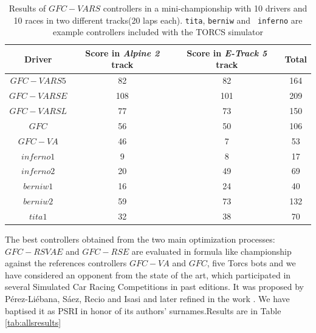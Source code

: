 \documentclass[10pt,journal,compsoc]{IEEEtran}
\begin{document}
%
\begin{table}[ht]
	\centering
	{\scriptsize
		\caption{ Results of $GFC-VARS$ controllers in a mini-championship with 10 drivers and 10
			races in two different tracks(20 laps each). {\tt tita}, {\tt berniw} and {\tt
				inferno} are example controllers included with the TORCS
			simulator \cite{torcs4}}
		{
			\begin{tabular}{|c|c|c||c|}
				\hline
				Driver&Score in \textit{Alpine 2} track &Score in \textit{E-Track 5} track &Total\\
				\hline
				\hline	
				$GFC-VARS5$&	82&	82&	164\\
				$GFC-VARSE$&	108&101&	209\\
				$GFC-VARSL$&	77&	73&	150\\
				$GFC$&	56&	50&	106\\
				$GFC-VA$&	46&	7&	53\\
				$inferno1$&	9&	8&	17\\
				$inferno2$&	20&	49&	69\\
				$berniw1$&	16&	24&	40\\
				$berniw2$&	59&	73&	132\\
				$tita1$&	32&	38&	70\\			
				\hline
				
			\end{tabular}
		}\label{tab:VaryingalphaRSresults}
	}
\end{table}
%
The best controllers obtained from the two main optimization processes: $GFC-RSVAE$ and $GFC-RSE$ are evaluated in formula like championship against the references controllers $GFC-VA$ and $GFC$, five Torcs bots and we have considered an opponent from the state of the art, which participated in several Simulated Car Racing Competitions in past editions. 
It was proposed by P{\'e}rez-Li{\'e}bana, S{\'a}ez, Recio and Isasi \cite{EvolvingRuleSystem08} and later refined in the work \cite{PerezEvolvingFuzzy09}. We have baptised it as PSRI in honor of its authors' surnames.Results are in Table \ref{tab:allsresults}
%
\end{document}
